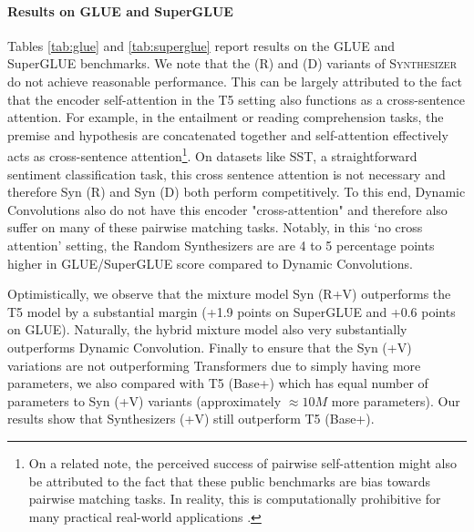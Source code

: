 \documentclass{article}
\begin{document}
\paragraph{Results on GLUE and SuperGLUE}
Tables \ref{tab:glue} and \ref{tab:superglue} report results on the GLUE and SuperGLUE benchmarks. We note that the (R) and (D) variants of \textsc{Synthesizer} do not achieve reasonable performance. This can be largely attributed to the fact that the encoder self-attention in the T5 setting also functions as a cross-sentence attention. For example, in the entailment or reading comprehension tasks, the premise and hypothesis are concatenated together and self-attention effectively acts as cross-sentence attention\footnote{On a related note, the perceived success of pairwise self-attention might also be attributed to the fact that these public benchmarks are bias towards pairwise matching tasks. In reality, this is computationally prohibitive for many practical real-world applications \citep{seo2018phrase}. }. On datasets like SST, a straightforward sentiment classification task, this cross sentence attention is not necessary and therefore Syn (R) and Syn (D) both perform competitively. To this end, Dynamic Convolutions \citep{wu2019pay} also do not have this encoder "cross-attention" and therefore also suffer on many of these pairwise matching tasks. Notably, in this `no cross attention' setting, the Random Synthesizers are are 4 to 5 percentage points higher in GLUE/SuperGLUE score compared to Dynamic Convolutions.

Optimistically, we observe that the mixture model Syn (R+V) outperforms the T5 model by a substantial margin (+1.9 points on SuperGLUE and +0.6 points on GLUE). Naturally, the hybrid mixture model also very substantially outperforms Dynamic Convolution. Finally to ensure that the Syn (+V) variations are not outperforming Transformers due to simply having more parameters, we also compared with T5 (Base+) which has equal number of parameters to Syn (+V) variants (approximately $\approx 10M$ more parameters). Our results show that Synthesizers (+V) still outperform T5 (Base+).
\end{document}
